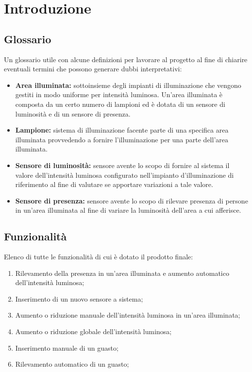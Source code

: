 \chapter{Introduzione}

\section{Glossario}
Un glossario utile con alcune definizioni per lavorare al progetto al fine di chiarire eventuali termini che possono generare dubbi interpretativi:
\begin{itemize}
    \item \textbf{Area illuminata:} sottoinsieme degli impianti di illuminazione che vengono gestiti in modo uniforme per intensità luminosa. Un'area illuminata è composta da un certo numero di lampioni ed è dotata di un sensore di luminosità e di un sensore di presenza.
    \item \textbf{Lampione:} sistema di illuminazione facente parte di una specifica area illuminata provvedendo a fornire l'illuminazione per una parte dell'area illuminata.
    \item \textbf{Sensore di luminosità:} sensore avente lo scopo di fornire al sistema il valore dell'intensità luminosa configurato nell'impianto d'illuminazione di riferimento al fine di valutare se apportare variazioni a tale valore.
    \item \textbf{Sensore di presenza:} sensore avente lo scopo di rilevare presenza di persone in un'area illuminata al fine di variare la luminosità dell'area a cui afferisce.
\end{itemize}

\section{Funzionalità}
Elenco di tutte le funzionalità di cui è dotato il prodotto finale:
\begin{enumerate}
    \item Rilevamento della presenza in un'area illuminata e aumento automatico dell'intensità luminosa;
    \item Inserimento di un nuovo sensore a sistema;
    \item Aumento o riduzione manuale dell'intensità luminosa in un'area illuminata;
    \item Aumento o riduzione globale dell'intensità luminosa;
    \item Inserimento manuale di un guasto;
    \item Rilevamento automatico di un guasto;
\end{enumerate}
